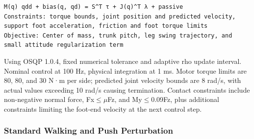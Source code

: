 \begin{Verbatim}[breaklines=true,breakanywhere=true,fontsize=\footnotesize]
M(q) qdd + bias(q, qd) = S^T τ + J(q)^T λ + passive
Constraints: torque bounds, joint position and predicted velocity, support foot acceleration, friction and foot torque limits
Objective: Center of mass, trunk pitch, leg swing trajectory, and small attitude regularization term
\end{Verbatim}

Using OSQP 1.0.4, fixed numerical tolerance and adaptive rho update interval. Nominal control at 100 Hz, physical integration at 1 ms. Motor torque limits are 80, 80, and 30 N·m per side; predicted joint velocity bounds are 8 rad/s, with actual values exceeding 10 rad/s causing termination. Contact constraints include non-negative normal force, \textbar Fx\textbar{}\(\leq\)\(\mu\)Fz, and \textbar My\textbar{}\(\leq\)0.09Fz, plus additional constraints limiting the foot-end velocity at the next control step.


\subsubsection{Standard Walking and Push Perturbation}\label{s21-detail-3}

